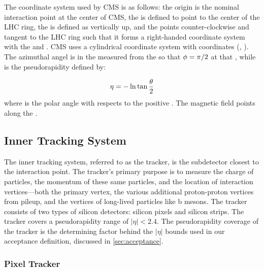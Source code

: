The coordinate system used by CMS is as follows: the origin is the nominal
interaction point at the center of CMS, the \xaxis is defined to point to the
center of the LHC ring, the \yaxis is defined as vertically up, and the \zaxis
points counter-clockwise and tangent to the LHC ring such that it forms a
right-handed coordinate system with the \xaxis and \yaxis. CMS uses a
cylindrical coordinate system with coordinates (\coordeta, \coordphi). The
azimuthal angel \coordphi is in the \xyplane measured from the \xaxis so that
$\phi=\pi/2$ at that \yaxis, while \coordeta is the pseudorapidity defined
by:

\begin{equation}
    \eta = -\operatorname{ln} \tan \frac{\theta}{2}
\end{equation}
%
where \coordtheta is the polar angle with respects to the positive \zaxis. The
magnetic field points along the \zaxis.

\subsection{Inner Tracking System}

The inner tracking system, referred to as the tracker, is the subdetector
closest to the interaction point. The tracker's primary purpose is to measure
the charge of particles, the momentum of these same particles, and the location
of interaction vertices---both the primary vertex, the various additional
proton-proton vertices from pileup, and the vertices of long-lived particles
like b mesons. The tracker consists of two types of silicon detectors: silicon
pixels and silicon strips. The tracker covers a pseudorapidity range of $|\eta|
< 2.4$. The pseudorapidity coverage of the tracker is the determining factor
behind the $|\eta|$ bounds used in our acceptance definition, discussed in
\cref{sec:acceptance}.

\subsubsection{Pixel Tracker}

